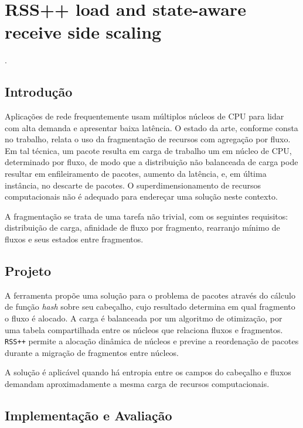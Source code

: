 
\chapter{RSS++ load and state-aware receive side scaling}
 \cite{barbette2019rsspp}.


\section*{Introdução}

Aplicações de rede frequentemente usam múltiplos núcleos de CPU para lidar com 
alta demanda e apresentar baixa latência. O estado da arte, conforme consta no 
trabalho, relata o uso da fragmentação de recursos com agregação por fluxo. Em 
tal técnica, um pacote resulta em carga de trabalho um em núcleo de CPU, 
determinado por fluxo, de modo que a distribuição não balanceada de carga pode 
resultar em enfileiramento de pacotes, aumento da latência, e, em última 
instância, no descarte de pacotes. O superdimensionamento de recursos 
computacionais não é adequado para endereçar uma solução neste contexto.

A fragmentação se trata de uma tarefa não trivial, com os seguintes requisitos: 
distribuição de carga, afinidade de fluxo por fragmento, rearranjo mínimo de 
fluxos e seus estados entre fragmentos.


\section*{Projeto}

A ferramenta propõe uma solução para o problema de pacotes através do cálculo 
de função \textit{hash} sobre seu cabeçalho, cujo resultado determina em qual 
fragmento o fluxo é alocado. A carga é balanceada por um algoritmo de 
otimização, por uma tabela compartilhada entre os núcleos que relaciona fluxos 
e fragmentos. \texttt{RSS++} permite a alocação dinâmica de núcleos e previne a 
reordenação de pacotes durante a migração de fragmentos entre núcleos.

A solução é aplicável quando há entropia entre os campos do cabeçalho e fluxos 
demandam aproximadamente a mesma carga de recursos computacionais.


\section*{Implementação e Avaliação}

